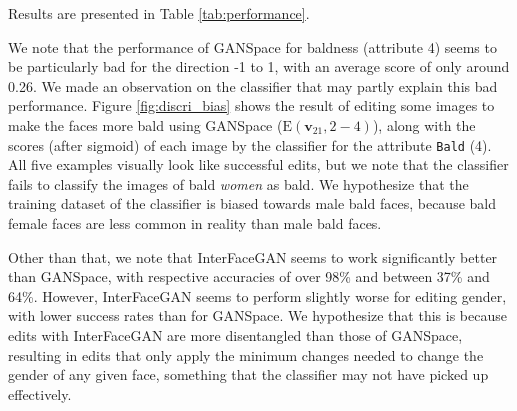 \documentclass[a4paper]{article}
\begin{document}
Results are presented in Table \ref{tab:performance}. %

We note that the performance of GANSpace for baldness (attribute 4) seems to be particularly bad for the direction -1 to 1, with an average score of only around 0.26. We made an observation on the classifier that may partly explain this bad performance. Figure \ref{fig:discri_bias} shows the result of editing some images to make the faces more bald using GANSpace ($\mathrm{E}(\mathbf{v}_{21}, 2-4)$), along with the scores (after sigmoid) of each image by the classifier for the attribute \texttt{Bald} (4). All five examples visually look like successful edits, but we note that the classifier fails to classify the images of bald \emph{women} as bald. We hypothesize that the training dataset of the classifier is biased towards male bald faces, because bald female faces are less common in reality than male bald faces.

Other than that, we note that InterFaceGAN seems to work significantly better than GANSpace, with respective accuracies of over 98\% and between 37\% and 64\%. However, InterFaceGAN seems to perform slightly worse for editing gender, with lower success rates than for GANSpace. We hypothesize that this is because edits with InterFaceGAN are more disentangled than those of GANSpace, resulting in edits that only apply the minimum changes needed to change the gender of any given face, something that the classifier may not have picked up effectively.
\end{document}
